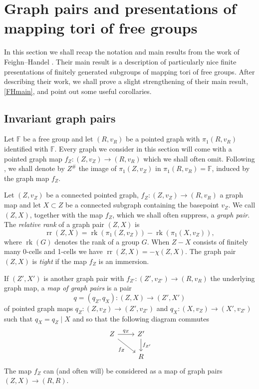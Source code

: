\documentclass[11pt, a4paper]{amsart}
\theoremstyle{definition}
\newcommand{\F}{\mathbb{F}}
\DeclareMathOperator{\rk}{rk}
\DeclareMathOperator{\rr}{rr}
\begin{document}
\section{Graph pairs and presentations of mapping tori of free groups}
\label{sec:graph_pairs}

In this section we shall recap the notation and main results from the work of Feighn--Handel \cite{FH99}. Their main result is a description of particularly nice finite presentations of finitely generated subgroups of mapping tori of free groups. After describing their work, we shall prove a slight strengthening of their main result, \cref{FHmain}, and point out some useful corollaries.

\subsection{Invariant graph pairs}

Let $\F$ be a free group and let $(R, v_R)$ be a pointed graph with $\pi_1(R, v_R)$ identified with $\F$. Every graph we consider in this section will come with a pointed graph map $f_Z\colon (Z, v_Z)\to (R, v_R)$ which we shall often omit. Following \cite{FH99}, we shall denote by $Z^{\#}$ the image of $\pi_1(Z, v_Z)$ in $\pi_1(R, v_R) = \F$, induced by the graph map $f_Z$.

Let $(Z, v_Z)$ be a connected pointed graph, $f_Z\colon (Z, v_Z)\to (R, v_R)$ a graph map and let $X\subset Z$ be a connected subgraph containing the basepoint $v_Z$. We call $(Z, X)$, together with the map $f_Z$, which we shall often suppress, a \emph{graph pair}. The \emph{relative rank} of a graph pair $(Z, X)$ is 
\[
\rr(Z, X) = \rk(\pi_1(Z, v_Z)) - \rk(\pi_1(X, v_Z)),
\]
where $\rk(G)$ denotes the rank of a group $G$. When $Z- X$ consists of finitely many 0-cells and 1-cells we have $\rr(Z, X) = -\chi(Z, X)$. The graph pair $(Z, X)$ is \emph{tight} if the map $f_Z$ is an immersion. 

If $(Z', X')$ is another graph pair with $f_{Z'}\colon (Z', v_{Z'})\to (R, v_R)$ the underlying graph map, a \emph{map of graph pairs} is a pair 
\[
q = (q_Z, q_X)\colon (Z, X)\to (Z', X')
\]
of pointed graph maps $q_Z\colon (Z, v_Z)\to(Z', v_{Z'})$ and $q_X\colon (X, v_Z)\to (X', v_{Z'})$ such that $q_X = q_Z\mid X$ and so that the following diagram commutes
\[
\begin{tikzcd}
Z \arrow[rd, "f_{Z}"'] \arrow[r, "q_Z"] & Z' \arrow[d, "f_{Z'}"] \\
                                        & R                     
\end{tikzcd}
\]
The map $f_Z$ can (and often will) be considered as a map of graph pairs $(Z, X) \to (R, R)$.
\end{document}
